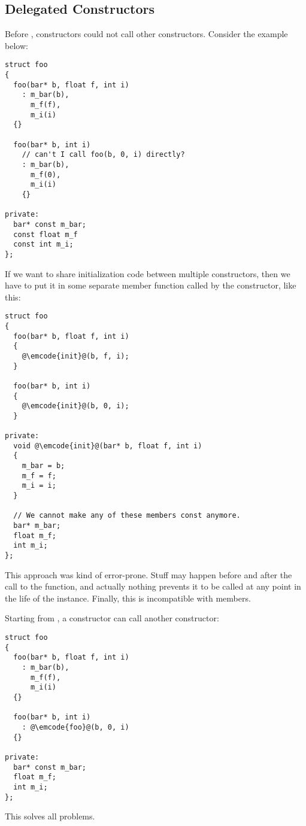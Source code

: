 \subsection{Delegated Constructors}

\problemtitle

Before , constructors could not call other
constructors. Consider the example below:

\begin{lstlisting}
struct foo
{
  foo(bar* b, float f, int i)
    : m_bar(b),
      m_f(f),
      m_i(i)
  {}

  foo(bar* b, int i)
    // can't I call foo(b, 0, i) directly?
    : m_bar(b),
      m_f(0),
      m_i(i)
    {}

private:
  bar* const m_bar;
  const float m_f
  const int m_i;
};
\end{lstlisting}

If we want to share initialization code between multiple constructors,
then we have to put it in some separate member function called by the
constructor, like this:

\begin{lstlisting}
struct foo
{
  foo(bar* b, float f, int i)
  {
    @\emcode{init}@(b, f, i);
  }

  foo(bar* b, int i)
  {
    @\emcode{init}@(b, 0, i);
  }

private:
  void @\emcode{init}@(bar* b, float f, int i)
  {
    m_bar = b;
    m_f = f;
    m_i = i;
  }

  // We cannot make any of these members const anymore.
  bar* m_bar;
  float m_f;
  int m_i;
};
\end{lstlisting}

This approach was kind of error-prone. Stuff may happen before and
after the call to the  function, and actually nothing
prevents it to be called at any point in the life of the
instance. Finally, this is incompatible with  members.

\solutiontitle

Starting from , a constructor can call another constructor:

\begin{lstlisting}
struct foo
{
  foo(bar* b, float f, int i)
    : m_bar(b),
      m_f(f),
      m_i(i)
  {}

  foo(bar* b, int i)
    : @\emcode{foo}@(b, 0, i)
  {}

private:
  bar* const m_bar;
  float m_f;
  int m_i;
};
\end{lstlisting}

This solves all problems.
